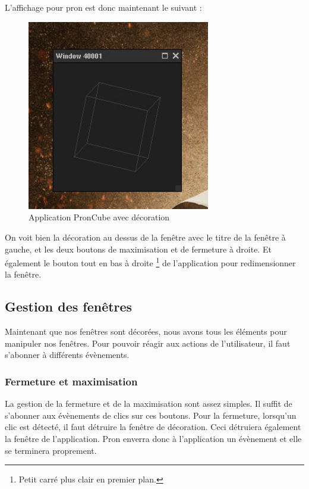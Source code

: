 L'affichage pour pron est donc maintenant le suivant :

\begin{figure}[H]
  \centering
  \includegraphics[width=8cm]{images/pron_cube_avec_decoration.jpg}
  \caption{Application PronCube avec décoration}
  \label{fig:pron_cube_avec_decoration}
\end{figure}

On voit bien la décoration au dessus de la fenêtre avec le titre de la fenêtre à gauche, et les deux boutons de maximisation et de fermeture à droite.
Et également le bouton tout en bas à droite
\footnote{Petit carré plus clair en premier plan.}
de l'application pour redimensionner la fenêtre.

\subsection{Gestion des fenêtres}

Maintenant que nos fenêtres sont décorées, nous avons tous les éléments pour manipuler nos fenêtres.
Pour pouvoir réagir aux actions de l'utilisateur, il faut s'abonner à différents évènements.

\subsubsection{Fermeture et maximisation}

La gestion de la fermeture et de la maximisation sont assez simples.
Il suffit de s'abonner aux évènements de clics sur ces boutons.
Pour la fermeture, lorsqu'un clic est détecté, il faut détruire la fenêtre de décoration.
Ceci détruiera également la fenêtre de l'application.
Pron enverra donc à l'application un évènement et elle se terminera proprement.

